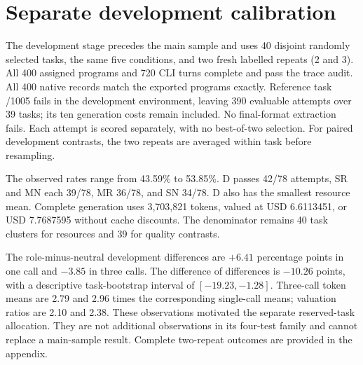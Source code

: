 \section{Separate development calibration}
\label{sec:dev40-results}
The development stage precedes the main sample and uses 40 disjoint randomly selected tasks, the same five conditions, and two fresh labelled repeats (2 and 3). All 400 assigned programs and 720 CLI turns complete and pass the trace audit. All 400 native records match the exported programs exactly. Reference task /1005 fails in the development environment, leaving 390 evaluable attempts over 39 tasks; its ten generation costs remain included. No final-format extraction fails. Each attempt is scored separately, with no best-of-two selection. For paired development contrasts, the two repeats are averaged within task before resampling.



The observed rates range from 43.59\% to 53.85\%. D passes 42/78 attempts, SR and MN each 39/78, MR 36/78, and SN 34/78. D also has the smallest resource mean. Complete generation uses 3,703,821 tokens, valued at USD 6.6113451, or USD 7.7687595 without cache discounts. The denominator remains 40 task clusters for resources and 39 for quality contrasts.



The role-minus-neutral development differences are $+6.41$ percentage points in one call and $-3.85$ in three calls. The difference of differences is $-10.26$ points, with a descriptive task-bootstrap interval of $[-19.23,-1.28]$. Three-call token means are 2.79 and 2.96 times the corresponding single-call means; valuation ratios are 2.10 and 2.38. These observations motivated the separate reserved-task allocation. They are not additional observations in its four-test family and cannot replace a main-sample result. Complete two-repeat outcomes are provided in the appendix.
